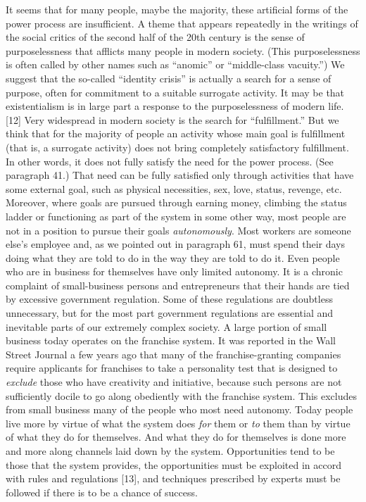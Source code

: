  It seems that for many people, maybe the majority, these artificial forms of the power process are insufficient. A theme that appears repeatedly in the writings of the social critics of the second half of the 20th century is the sense of purposelessness that afflicts many people in modern society. (This purposelessness is often called by other names such as “anomic” or “middle-class vacuity.”) We suggest that the so-called “identity crisis” is actually a search for a sense of purpose, often for commitment to a suitable surrogate activity. It may be that existentialism is in large part a response to the purposelessness of modern life. [12] Very widespread in modern society is the search for “fulfillment.” But we think that for the majority of people an activity whose main goal is fulfillment (that is, a surrogate activity) does not bring completely satisfactory fulfillment. In other words, it does not fully satisfy the need for the power process. (See paragraph 41.) That need can be fully satisfied only through activities that have some external goal, such as physical necessities, sex, love, status, revenge, etc.\break
{} Moreover, where goals are pursued through earning money, climbing the status ladder or functioning as part of the system in some other way, most people are not in a position to pursue their goals {\em autonomously}. Most workers are someone else’s employee and, as we pointed out in paragraph 61, must spend their days doing what they are told to do in the way they are told to do it. Even people who are in business for themselves have only limited autonomy. It is a chronic complaint of small-business persons and entrepreneurs that their hands are tied by excessive government regulation. Some of these regulations are doubtless unnecessary, but for the most part government regulations are essential and inevitable parts of our extremely complex society. A large portion of small business today operates on the franchise system. It was reported in the Wall Street Journal a few years ago that many of the franchise-granting companies require applicants for franchises to take a personality test that is designed to {\em exclude} those who have creativity and initiative, because such persons are not sufficiently docile to go along obediently with the franchise system. This excludes from small business many of the people who most need autonomy.
 Today people live more by virtue of what the system does {\em for} them or {\em to} them than by virtue of what they do for themselves. And what they do for themselves is done more and more along channels laid down by the system. Opportunities tend to be those that the system provides, the opportunities must be exploited in accord with rules and regulations [13], and techniques prescribed by experts must be followed if there is to be a chance of success.
